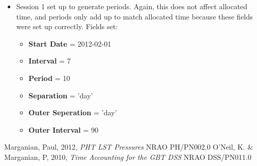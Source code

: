 \documentclass{article}
\begin{document}
\begin{itemize}
\item Session 1 set up to generate periods. Again, this does not affect allocated time, and periods only add up to match allocated time because these fields were set up correctly. Fields set:
    \begin{itemize}
    \item {\bf Start Date } = 2012-02-01
    \item {\bf Interval } = 7
    \item {\bf Period } = 10
    \item {\bf Separation } = 'day'
    \item {\bf Outer Seperation } = 'day'
    \item {\bf Outer Interval } = 90
    \end{itemize}
\end{itemize}

\begin{thebibliography}{}
 {Marganian, Paul, 2012, {\it PHT LST Pressures} NRAO PH/PN002.0}
 {O'Neil, K. \& Marganian, P, 2010, {\it Time Accounting for the GBT DSS} NRAO DSS/PN011.0}
\end{thebibliography}
\end{document}
